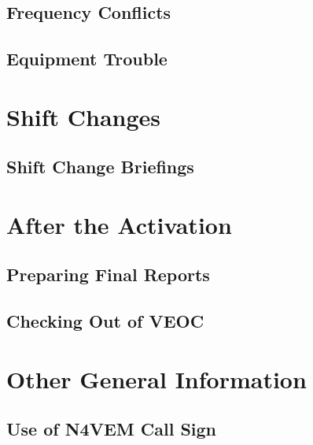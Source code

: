 \documentclass[pdflatex,letterpaper,twoside,12pt]{book}
\begin{document}
\subsection{Frequency Conflicts}

\subsection{Equipment Trouble}


\section{Shift Changes}

\subsection{Shift Change Briefings}


\section{After the Activation}

\subsection{Preparing Final Reports}

\subsection{Checking Out of VEOC}


\section{Other General Information}

\subsection{Use of N4VEM Call Sign}
\end{document}
